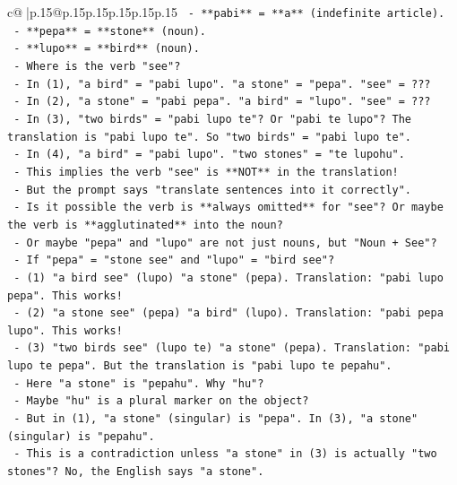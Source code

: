 \documentclass{article}
\begin{document}
{\begin{supertabular}{c@{$\;$}|p{.15\linewidth}@{}p{.15\linewidth}p{.15\linewidth}p{.15\linewidth}p{.15\linewidth}p{.15\linewidth}}
{{{\texttt{              {-} **pabi** = **a** (indefinite article).} \\
\texttt{              {-} **pepa** = **stone** (noun).} \\
\texttt{              {-} **lupo** = **bird** (noun).} \\
\texttt{              {-} Where is the verb "see"?} \\
\texttt{              {-} In (1), "a bird" = "pabi lupo". "a stone" = "pepa". "see" = ???} \\
\texttt{              {-} In (2), "a stone" = "pabi pepa". "a bird" = "lupo". "see" = ???} \\
\texttt{              {-} In (3), "two birds" = "pabi lupo te"? Or "pabi te lupo"? The translation is "pabi lupo te". So "two birds" = "pabi lupo te".} \\
\texttt{              {-} In (4), "a bird" = "pabi lupo". "two stones" = "te lupohu".} \\
\texttt{              {-} This implies the verb "see" is **NOT** in the translation!} \\
\texttt{              {-} But the prompt says "translate sentences into it correctly".} \\
\texttt{              {-} Is it possible the verb is **always omitted** for "see"? Or maybe the verb is **agglutinated** into the noun?} \\
\texttt{              {-} Or maybe "pepa" and "lupo" are not just nouns, but "Noun + See"?} \\
\texttt{              {-} If "pepa" = "stone see" and "lupo" = "bird see"?} \\
\texttt{                {-} (1) "a bird see" (lupo) "a stone" (pepa). Translation: "pabi lupo pepa". This works!} \\
\texttt{                {-} (2) "a stone see" (pepa) "a bird" (lupo). Translation: "pabi pepa lupo". This works!} \\
\texttt{                {-} (3) "two birds see" (lupo te) "a stone" (pepa). Translation: "pabi lupo te pepa". But the translation is "pabi lupo te pepahu".} \\
\texttt{                  {-} Here "a stone" is "pepahu". Why "hu"?} \\
\texttt{                  {-} Maybe "hu" is a plural marker on the object?} \\
\texttt{                  {-} But in (1), "a stone" (singular) is "pepa". In (3), "a stone" (singular) is "pepahu".} \\
\texttt{                  {-} This is a contradiction unless "a stone" in (3) is actually "two stones"? No, the English says "a stone".} \\
}}}
\end{supertabular}}
\end{document}
